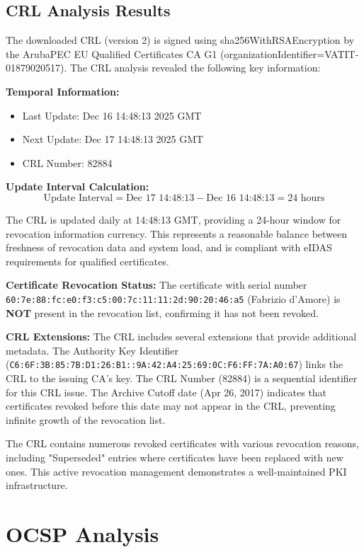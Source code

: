 \documentclass[12pt,a4paper]{article}
\begin{document}
\subsection{CRL Analysis Results}

The downloaded CRL (version 2) is signed using sha256WithRSAEncryption by the ArubaPEC EU Qualified Certificates CA G1 (organizationIdentifier=VATIT-01879020517). The CRL analysis revealed the following key information:

\textbf{Temporal Information:}
\begin{itemize}
    \item Last Update: Dec 16 14:48:13 2025 GMT
    \item Next Update: Dec 17 14:48:13 2025 GMT
    \item CRL Number: 82884
\end{itemize}

\textbf{Update Interval Calculation:}
\[
\text{Update Interval} = \text{Dec 17 14:48:13} - \text{Dec 16 14:48:13} = 24 \text{ hours}
\]

The CRL is updated daily at 14:48:13 GMT, providing a 24-hour window for revocation information currency. This represents a reasonable balance between freshness of revocation data and system load, and is compliant with eIDAS requirements for qualified certificates.

\textbf{Certificate Revocation Status:} The certificate with serial number \texttt{60:7e:88:fc:e0:f3:c5:00:\allowbreak 7c:11:11:2d:90:20:46:a5} (Fabrizio d'Amore) is \textbf{NOT} present in the revocation list, confirming it has not been revoked.

\textbf{CRL Extensions:} The CRL includes several extensions that provide additional metadata. The Authority Key Identifier (\texttt{C6:6F:3B:85:7B:D1:26:B1::9A:42:A4:25:69:0C:F6:\allowbreak FF:7A:A0:67}) links the CRL to the issuing CA's key. The CRL Number (82884) is a sequential identifier for this CRL issue. The Archive Cutoff date (Apr 26, 2017) indicates that certificates revoked before this date may not appear in the CRL, preventing infinite growth of the revocation list.

The CRL contains numerous revoked certificates with various revocation reasons, including "Superseded" entries where certificates have been replaced with new ones. This active revocation management demonstrates a well-maintained PKI infrastructure.

\section{OCSP Analysis}
\end{document}
